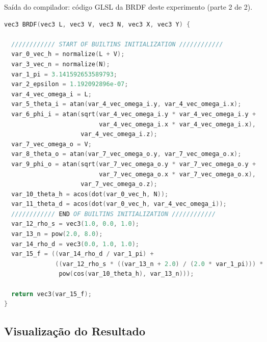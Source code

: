 \begin{codigo}[H]
    \caption{\small Saída do compilador: código GLSL da BRDF deste experimento (parte 2 de 2).}
    \label{cod-blinn-phong-glsl-pt-2}
\begin{lstlisting}[language=C, inputencoding=utf8]
vec3 BRDF(vec3 L, vec3 V, vec3 N, vec3 X, vec3 Y) {

  //////////// START OF BUILTINS INITIALIZATION ////////////
  var_0_vec_h = normalize(L + V);
  var_3_vec_n = normalize(N);
  var_1_pi = 3.141592653589793;
  var_2_epsilon = 1.192092896e-07;
  var_4_vec_omega_i = L;
  var_5_theta_i = atan(var_4_vec_omega_i.y, var_4_vec_omega_i.x);
  var_6_phi_i = atan(sqrt(var_4_vec_omega_i.y * var_4_vec_omega_i.y +
                          var_4_vec_omega_i.x * var_4_vec_omega_i.x),
                     var_4_vec_omega_i.z);
  var_7_vec_omega_o = V;
  var_8_theta_o = atan(var_7_vec_omega_o.y, var_7_vec_omega_o.x);
  var_9_phi_o = atan(sqrt(var_7_vec_omega_o.y * var_7_vec_omega_o.y +
                          var_7_vec_omega_o.x * var_7_vec_omega_o.x),
                     var_7_vec_omega_o.z);
  var_10_theta_h = acos(dot(var_0_vec_h, N));
  var_11_theta_d = acos(dot(var_0_vec_h, var_4_vec_omega_i));
  //////////// END OF BUILTINS INITIALIZATION ////////////
  var_12_rho_s = vec3(1.0, 0.0, 1.0);
  var_13_n = pow(2.0, 8.0);
  var_14_rho_d = vec3(0.0, 1.0, 1.0);
  var_15_f = ((var_14_rho_d / var_1_pi) +
              ((var_12_rho_s * ((var_13_n + 2.0) / (2.0 * var_1_pi))) *
               pow(cos(var_10_theta_h), var_13_n)));

  return vec3(var_15_f);
}
\end{lstlisting}
\end{codigo}

\subsection{Visualização do Resultado}

